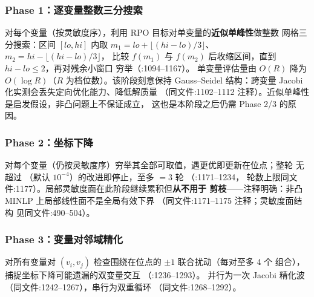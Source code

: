 \subsubsection*{Phase 1：逐变量整数三分搜索}
对每个变量（按灵敏度序），利用 RPO 目标对单变量的\textbf{近似单峰性}做整数
网格三分搜索：区间 $[lo,hi]$ 内取
$m_1=lo+\lfloor(hi-lo)/3\rfloor$、$m_2=hi-\lfloor(hi-lo)/3\rfloor$，
比较 $f(m_1)$ 与 $f(m_2)$ 后收缩区间，直到 $hi-lo\le 2$，再对残余小窗口
穷举（:1094--1167）。
单变量评估量由 $O(R)$ 降为 $O(\log R)$（$R$ 为档位数）。该阶段刻意保持
Gauss--Seidel 结构：跨变量 Jacobi 化实测会丢失定向优化能力、降低解质量
（同文件:1102--1112 注释）。近似单峰性是启发假设，非凸问题上不保证成立，
这也是本阶段之后仍需 Phase 2/3 的原因。

\subsubsection*{Phase 2：坐标下降}
对每个变量（仍按灵敏度序）穷举其全部可取值，遇更优即更新在位点；整轮
无超过 （默认 $10^{-4}$）的改进即停止，至多
${}=3$ 轮
（:1171--1234，
轮数上限同文件:1177）。局部灵敏度面在此阶段继续累积但\textbf{从不用于
剪枝}——注释明确：非凸 MINLP 上局部线性面不是全局有效下界
（同文件:1171--1175 注释；灵敏度面结构
 见同文件:490--504）。

\subsubsection*{Phase 3：变量对邻域精化}
对所有变量对 $(v_i,v_j)$ 检查围绕在位点的 $\pm1$ 联合扰动（每对至多 4 个
组合），捕捉坐标下降可能遗漏的双变量交互
（:1236--1293）。
并行为一次 Jacobi 精化波（同文件:1242--1267），串行为双重循环
（同文件:1268--1292）。

